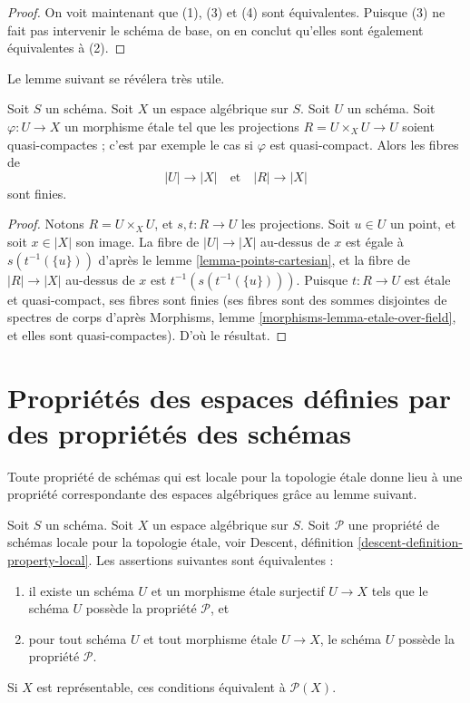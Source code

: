 \begin{proof}
\medskip\noindent
On voit maintenant que (1), (3) et (4) sont équivalentes. Puisque (3) ne
fait pas intervenir le schéma de base, on en conclut qu'elles sont également équivalentes
à (2).
\end{proof}

\noindent
Le lemme suivant se révélera très utile.

\begin{lemma}
\label{lemma-finite-fibres-presentation}
Soit $S$ un schéma.
Soit $X$ un espace algébrique sur $S$.
Soit $U$ un schéma. Soit $\varphi : U \to X$ un morphisme étale tel que
les projections $R = U \times_X U \to U$ soient quasi-compactes ; c'est par exemple le cas si
$\varphi$ est quasi-compact. Alors les fibres de
$$
|U| \to |X|
\quad\text{et}\quad
|R| \to |X|
$$
sont finies.
\end{lemma}

\begin{proof}
Notons $R = U \times_X U$, et $s, t : R \to U$ les projections.
Soit $u \in U$ un point, et soit $x \in |X|$ son image.
La fibre de $|U| \to |X|$ au-dessus de $x$ est égale à
$s(t^{-1}(\{u\}))$ d'après le
lemme \ref{lemma-points-cartesian},
et la fibre de $|R| \to |X|$ au-dessus de $x$ est $t^{-1}(s(t^{-1}(\{u\})))$.
Puisque $t : R \to U$ est étale et quasi-compact, ses fibres sont finies
(ses fibres sont des sommes disjointes de spectres de corps d'après
Morphisms, lemme \ref{morphisms-lemma-etale-over-field},
et elles sont quasi-compactes). D'où le résultat.
\end{proof}








\section{Propriétés des espaces définies par des propriétés des schémas}
\label{section-types-properties}

\noindent
Toute propriété de schémas qui est locale pour la topologie \'etale donne lieu à une
propriété correspondante des espaces algébriques grâce au lemme suivant.

\begin{lemma}
\label{lemma-type-property}
Soit $S$ un schéma.
Soit $X$ un espace algébrique sur $S$.
Soit $\mathcal{P}$ une propriété de schémas locale pour la topologie \'etale,
voir
Descent, définition \ref{descent-definition-property-local}.
Les assertions suivantes sont équivalentes :
\begin{enumerate}
\item il existe un schéma $U$ et un morphisme \'etale surjectif $U \to X$
tels que le schéma $U$ possède la propriété $\mathcal{P}$, et
\item pour tout schéma $U$ et tout morphisme \'etale $U \to X$,
le schéma $U$ possède la propriété $\mathcal{P}$.
\end{enumerate}
Si $X$ est représentable, ces conditions équivalent à $\mathcal{P}(X)$.
\end{lemma}

